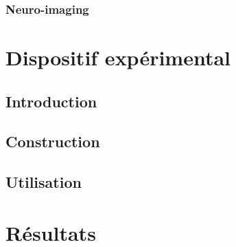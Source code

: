   \subsection{Neuro-imaging}


\chapter{Dispositif expérimental}

  \section{Introduction}

  \section{Construction}

  \section{Utilisation}


\chapter{Résultats}
